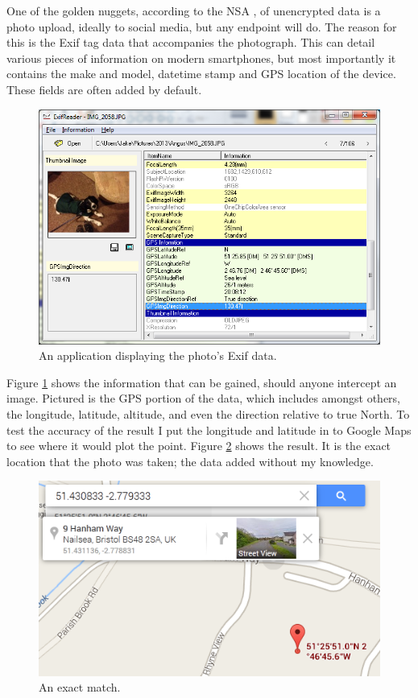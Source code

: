 One of the golden nuggets, according to the NSA \cite{intro:angry_leak}, of unencrypted data is a photo upload, ideally to social media, but any endpoint will do. The reason for this is the Exif \cite{intro:exif_wiki} tag data that accompanies the photograph. This can detail various pieces of information on modern smartphones, but most importantly it contains the make and model, datetime stamp and GPS location \cite{intro:wiki_geotag} of the device. These fields are often added by default. 

\begin{figure}[htb!]
\centering\includegraphics{intro/diagrams/exif-data.png}
\caption{An application displaying the photo's Exif data.}
\label{angus}
\end{figure}
\clearpage

Figure \ref{angus} shows the information that can be gained, should anyone intercept an image. Pictured is the GPS portion of the data, which includes amongst others, the longitude, latitude, altitude, and even the direction relative to true North. To test the accuracy of the result I put the longitude and latitude in to Google Maps to see where it would plot the point. Figure \ref{gmaps} shows the result. It is the exact location that the photo was taken; the data added without my knowledge.

\begin{figure}[htb!]
\centering\includegraphics{intro/diagrams/g-maps-location.png}
\caption{An exact match.}
\label{gmaps}
\end{figure}


